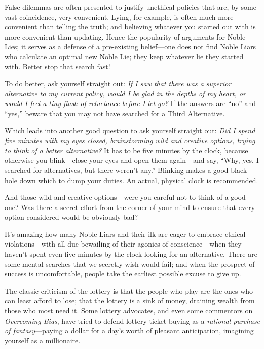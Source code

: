 {
 False dilemmas are often presented to justify unethical policies
that are, by some vast coincidence, very convenient. Lying, for
example, is often much more convenient than telling the truth; and
believing whatever you started out with is more convenient than
updating. Hence the popularity of arguments for Noble Lies; it serves
as a defense of a pre-existing belief---one does not find Noble Liars
who calculate an optimal new Noble Lie; they keep whatever lie they
started with. Better stop that search fast!}

{
 To do better, ask yourself straight out: \textit{If I saw that
there was a superior alternative to my current policy, would I be glad
in the depths of my heart, or would I feel a tiny flash of reluctance
before I let go?} If the answers are
``no'' and
``yes,'' beware that you may not
have searched for a Third Alternative.}

{
 Which leads into another good question to ask yourself straight
out: \textit{Did I spend five minutes with my eyes closed,
brainstorming wild and creative options, trying to think of a better
alternative?} It has to be five minutes by the clock, because otherwise
you blink---close your eyes and open them again---and say,
``Why, yes, I searched for alternatives, but there
weren't any.'' Blinking makes a good
black hole down which to dump your duties. An actual, physical clock is
recommended.}

{
 And those wild and creative options---were you careful not to
think of a good one? Was there a secret effort from the corner of your
mind to ensure that every option considered would be obviously bad?}

{
 It's amazing how many Noble Liars and their ilk
are eager to embrace ethical violations---with all due bewailing of
their agonies of conscience---when they haven't spent
even five minutes by the clock looking for an alternative. There are
some mental searches that we secretly wish would fail; and when the
prospect of success is uncomfortable, people take the earliest possible
excuse to give up.}

\myendsectiontext



{
 The classic criticism of the lottery is that the people who play
are the ones who can least afford to lose; that the lottery is a sink
of money, draining wealth from those who most need it. Some lottery
advocates, and even some commentors on \textit{Overcoming Bias}, have
tried to defend lottery-ticket buying as a \textit{rational purchase of
fantasy}{}---paying a dollar for a day's worth of
pleasant anticipation, imagining yourself as a millionaire. }

